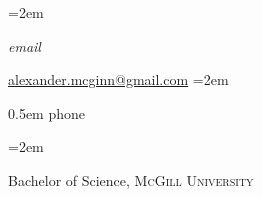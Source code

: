 \documentclass[footinclude, headinclude, letterpaper]{scrartcl}
\date{}
\newcommand{\MarginText}[1]{\marginnote{\raggedleft\itshape\small#1}} %
\newcommand{\TitleText}[1]{\hangindent=2em\hangafter=0\noindent\raggedright\normalsize{#1}\par\normalsize\hspace{1.5em}}
\newlength{\datebox}\settowidth{\datebox}{Spring 2011} %
\newcommand{\NewEntry}[3]{\noindent\hangindent=2em\hangafter=0 \parbox{\datebox}{\small \textit{#1}}\hspace{1.5em} #2 #3 %
\vspace{0.5em}} %
\newcommand{\Description}[1]{\hangindent=2em\hangafter=0\noindent\raggedright\footnotesize{#1}\par\normalsize\vspace{1em}} %
\begin{document}
\thispagestyle{empty} %




\begin{cv}{}\vspace{1.5em} %

\noindent{}\vspace{0.5em} %

\NewEntry{email}{\href{mailto:alexander.mcginn@gmail.com}{alexander.mcginn@gmail.com}} %

\NewEntry{phone}{+1 (416) 662 9666} %

\vspace{0.75em} %






\vspace{1em}

\TitleText{Bachelor of Science,  \textsc{McGill University}}



\end{cv}
\end{document}
